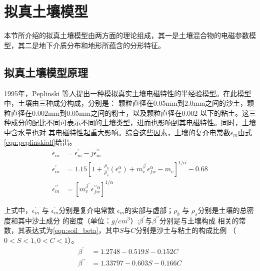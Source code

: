 \section{拟真土壤模型}
本节所介绍的拟真土壤模型由两方面的理论组成，其一是土壤混合物的电磁参数模型，其二是地下介质分布和地形所蕴含的分形特征。
\subsection{拟真土壤模型原理}
1995年，Peplinski 等人提出一种模拟真实土壤电磁特性的半经验模型。在此模型中，土壤由三种成分构成，分别是：
颗粒直径在0.05mm到2.0mm之间的沙土，颗粒直径在0.002mm到0.05mm之间的粉土，以及颗粒直径在0.002
以下的粘土。这三种成分的配比不同可表示不同的土壤类型，进而也影响到其电磁特性。同时，土壤中含水量也对
其电磁特性起重大影响。综合这些因素，土壤的复介电常数$\epsilon_m$由式\ref{eqn:peplinskiall}给出。
\begin{equation} 
	\label{eqn:peplinskiall} 
	\begin{aligned} \epsilon_{m} &=\epsilon_{m}^{\prime}-j \epsilon_{m}^{\prime \prime} \\ 
\epsilon_{m}^{\prime} &=1.15 \left[1+\frac{\rho_{b}}{\rho_{s}}\left(\epsilon_{s}^{\alpha}\right)+m_{v}^{\beta^{\prime}} \epsilon_{f w}^{\alpha}-m_{v}\right]^{1 / \alpha} - 0.68\\ 
\epsilon_{m}^{\prime \prime} &=\left[m_{v}^{\beta^{\prime \prime}} \epsilon_{f w}^{\prime \prime \alpha}\right]^{1 / \alpha} \end{aligned}
\end{equation}

上式中，$\epsilon_{m}^{\prime}$ 与 $\epsilon_{m}^{\prime}$分别是复介电常数
$\epsilon_m$的实部与虚部；$\rho_{b}$ 与 $\rho_{s}$分别是土壤的总密度和其中沙土成分
的密度（单位：$g/cm^3$）;$\beta^\prime$与$\beta^{\prime \prime}$分别是与土壤构成
相关的常数，其表达式为\ref{eqn:soil_beta}，其中$S$与$C$分别是沙土与粘土的构成比例
（$0<S<1, 0<C<1$）。
\begin{equation} 
	\label{eqn:soil_beta}
	\begin{aligned}
\beta^{\prime}&=1.2748-0.519 S-0.152 C \\
\beta^{\prime \prime}&=1.33797-0.603 S-0.166 C
	\end{aligned}
\end{equation}

